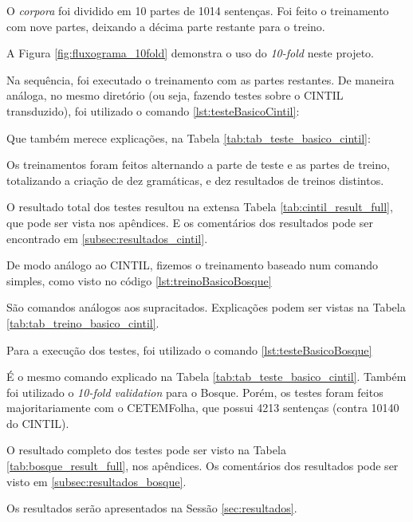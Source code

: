 O \textit{corpora} foi dividido em 10 partes de 1014 sentenças. Foi feito o treinamento com nove partes, deixando a décima parte restante para o treino.

A Figura \ref{fig:fluxograma_10fold} demonstra o uso do \textit{10-fold} neste projeto.

\begin{center}
    
\end{center}

Na sequência, foi executado o treinamento com as partes restantes. De maneira análoga, no mesmo diretório (ou seja, fazendo testes sobre o CINTIL transduzido), foi utilizado o comando \ref{lst:testeBasicoCintil}:

\begin{center}
    
\end{center}

Que também merece explicações, na Tabela \ref{tab:tab_teste_basico_cintil}:
\begin{center}
    
\end{center}

Os treinamentos foram feitos alternando a parte de teste e as partes de treino, totalizando a criação de dez gramáticas, e dez resultados de treinos distintos.

O resultado total dos testes resultou na extensa Tabela \ref{tab:cintil_result_full}, que pode ser vista nos apêndices. E os comentários dos resultados pode ser encontrado em \ref{subsec:resultados_cintil}.

De modo análogo ao CINTIL, fizemos o treinamento baseado num comando simples, como visto no código \ref{lst:treinoBasicoBosque}
\begin{center}
    
\end{center}

São comandos análogos aos supracitados. Explicações podem ser vistas na Tabela \ref{tab:tab_treino_basico_cintil}.

Para a execução dos testes, foi utilizado o comando \ref{lst:testeBasicoBosque}
\begin{center}
    
\end{center}

É o mesmo comando explicado na Tabela \ref{tab:tab_teste_basico_cintil}. Também foi utilizado o \textit{10-fold validation} para o Bosque. Porém, os testes foram feitos majoritariamente com o CETEMFolha, que possui 4213 sentenças (contra 10140 do CINTIL).

O resultado completo dos testes pode ser visto na Tabela \ref{tab:bosque_result_full}, nos apêndices. Os comentários dos resultados pode ser visto em \ref{subsec:resultados_bosque}.

Os resultados serão apresentados na Sessão \ref{sec:resultados}.